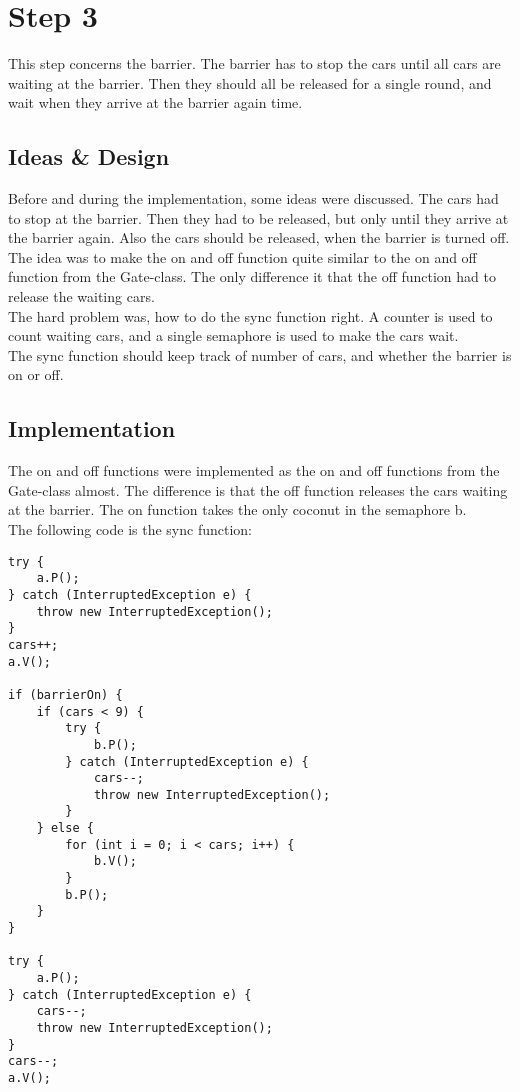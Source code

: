 \section{Step 3}
This step concerns the barrier. The barrier has to stop the cars until all cars are waiting at the barrier. Then they should all be released for a single round, and wait when they arrive at the barrier again time.

\subsection{Ideas \& Design}
Before and during the implementation, some ideas were discussed. The cars had to stop at the barrier. Then they had to be released, but only until they arrive at the barrier again. Also the cars should be released, when the barrier is turned off. \\
The idea was to make the on and off function quite similar to the on and off function from the Gate-class. The only difference it that the off function had to release the waiting cars.\\ 
The hard problem was, how to do the sync function right. A counter is used to count waiting cars, and a single semaphore is used to make the cars wait. \\
The sync function should keep track of number of cars, and whether the barrier is on or off.

\subsection{Implementation}
The on and off functions were implemented as the on and off functions from the Gate-class almost. The difference is that the off function releases the cars waiting at the barrier. The on function takes the only coconut in the semaphore b.\\

The following code is the sync function:
\begin{lstlisting}
try {
	a.P();
} catch (InterruptedException e) {
	throw new InterruptedException();
}
cars++;
a.V();

if (barrierOn) {
	if (cars < 9) {
		try {
			b.P();
		} catch (InterruptedException e) {
			cars--;
			throw new InterruptedException();
		}
	} else {
		for (int i = 0; i < cars; i++) {
			b.V();
		}
		b.P();
	}
}

try {
	a.P();
} catch (InterruptedException e) {
	cars--;
	throw new InterruptedException();
}
cars--;
a.V();
\end{lstlisting}
\vspace{.8cm}

